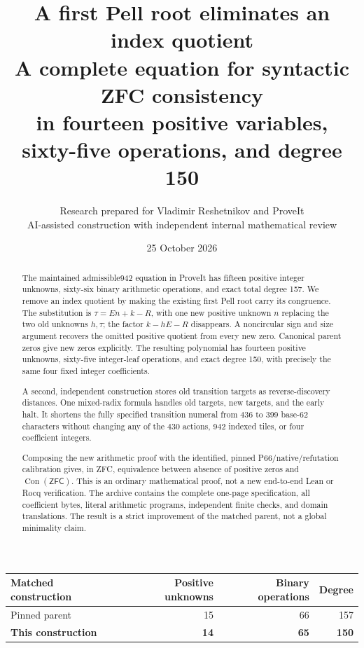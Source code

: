 \documentclass[11pt,letterpaper]{article}
\title{\textbf{A first Pell root eliminates an index quotient}\\[0.5em]
  \large A complete equation for syntactic ZFC consistency\\
  in fourteen positive variables, sixty-five operations, and degree 150}
\author{Research prepared for Vladimir Reshetnikov and ProveIt\\
  \small AI-assisted construction with independent internal mathematical review}
\date{25 October 2026}
\theoremstyle{definition}
\newcommand{\ZFC}{\mathsf{ZFC}}
\newcommand{\Con}{\operatorname{Con}}
\begin{document}
\maketitle
\thispagestyle{empty}

\begin{abstract}
The maintained admissible942 equation in ProveIt has fifteen positive integer
unknowns, sixty-six binary arithmetic operations, and exact total degree 157.
We remove an index quotient by making the existing first Pell root carry its
congruence. The substitution is
\(\tau=En+k-R\), with one new positive unknown \(n\) replacing the two old
unknowns \(h,\tau\); the factor \(k-hE-R\) disappears. A noncircular sign and
size argument recovers the omitted positive quotient from every new zero.
Canonical parent zeros give new zeros explicitly. The resulting polynomial
has fourteen positive unknowns, sixty-five integer-leaf operations, and exact
degree 150, with precisely the same four fixed integer coefficients.

A second, independent construction stores old transition targets as
reverse-discovery distances. One mixed-radix formula handles old targets,
new targets, and the early halt. It shortens the fully specified transition
numeral from 436 to 399 base-62 characters without changing any of the 430
actions, 942 indexed tiles, or four coefficient integers.

Composing the new arithmetic proof with the identified, pinned
P66/native/refutation calibration gives, in ZFC, equivalence between absence
of positive zeros and \(\Con(\ZFC)\). This is an ordinary mathematical proof,
not a new end-to-end Lean or Rocq verification. The archive contains the
complete one-page specification, all coefficient bytes, literal arithmetic
programs, independent finite checks, and domain translations. The result is
a strict improvement of the matched parent, not a global minimality claim.
\end{abstract}

\vfill
\begin{center}
\begin{tabular}{lrrr}
\toprule
Matched construction & Positive unknowns & Binary operations & Degree\\
\midrule
Pinned parent & 15 & 66 & 157\\
\textbf{This construction} & \textbf{14} & \textbf{65} & \textbf{150}\\
\bottomrule
\end{tabular}
\end{center}
\vfill
\clearpage
\setcounter{tocdepth}{1}
\tableofcontents
\clearpage
\end{document}
